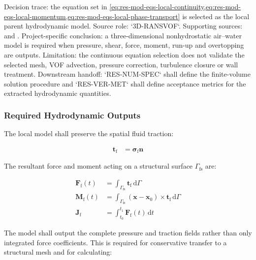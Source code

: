 Decision trace: the equation set in
\cref{eq:res-mod-eqs-local-continuity,eq:res-mod-eqs-local-momentum,eq:res-mod-eqs-local-phase-transport}
is selected as the local parent hydrodynamic model. Source role:
`3D-RANSVOF`. Supporting sources:
\textcite{qin2018comparison} and \textcite{watanabe2022validation}.
Project-specific conclusion: a three-dimensional nonhydrostatic
air--water model is required when pressure, shear, force, moment,
run-up and overtopping are outputs. Limitation: the continuous equation
selection does not validate the selected mesh, VOF advection, pressure
correction, turbulence closure or wall treatment. Downstream handoff:
`RES-NUM-SPEC` shall define the finite-volume solution procedure and
`RES-VER-MET` shall define acceptance metrics for the extracted
hydrodynamic quantities.

\subsubsection{Required Hydrodynamic Outputs}
\label{sec:res-mod-eqs-local-required-outputs}

The local model shall preserve the spatial fluid traction:

\begin{align}
  \mathbf{t}_{\mathrm{f}}
  &=
  \boldsymbol{\sigma}_{\mathrm{f}}\mathbf{n}
  \label{eq:res-mod-eqs-local-fluid-traction}
\end{align}

The resultant force and moment acting on a structural surface
$\Gamma_{\mathrm{fs}}$ are:

\begin{align}
  \mathbf{F}_{\mathrm{f}}(t)
  &=
  \int_{\Gamma_{\mathrm{fs}}}
  \mathbf{t}_{\mathrm{f}}
  \,\mathrm{d}\Gamma
  \label{eq:res-mod-eqs-local-resultant-force}
  \\
  \mathbf{M}_{\mathrm{f}}(t)
  &=
  \int_{\Gamma_{\mathrm{fs}}}
  \left(
    \mathbf{x}-\mathbf{x}_{0}
  \right)
  \times
  \mathbf{t}_{\mathrm{f}}
  \,\mathrm{d}\Gamma
  \label{eq:res-mod-eqs-local-resultant-moment}
  \\
  \mathbf{J}_{\mathrm{f}}
  &=
  \int_{t_{0}}^{t_{1}}
  \mathbf{F}_{\mathrm{f}}(t)
  \,\mathrm{d}t
  \label{eq:res-mod-eqs-local-force-impulse}
\end{align}

The model shall output the complete pressure and traction fields rather
than only integrated force coefficients. This is required for
conservative transfer to a structural mesh and for calculating:


